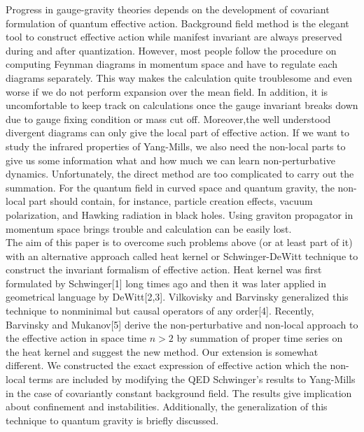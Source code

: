 \documentclass[a4paper,12 pt]{article}
\begin{document}
Progress in gauge-gravity theories depends on the development of
covariant formulation of quantum effective action. Background
field method is the elegant tool to construct effective action
while manifest invariant are always preserved during and after
quantization. However, most people follow the procedure on
computing Feynman diagrams in momentum space and have to regulate
each diagrams separately. This way makes the calculation quite
troublesome and even worse if we do not perform expansion over the
mean field. In addition, it is uncomfortable to keep track on
calculations once the gauge invariant breaks down due to gauge
fixing condition or mass cut off. Moreover,the well understood
divergent diagrams can only give the local part of effective
action. If we want to study the infrared properties of Yang-Mills,
we also need the non-local parts to give us some information what
and how much we can learn non-perturbative dynamics.
Unfortunately, the direct method are too complicated to carry out
the summation. For the quantum field in curved space and quantum
gravity, the non-local part should contain, for instance, particle
creation effects, vacuum polarization, and Hawking radiation in
black holes. Using graviton propagator in momentum space brings
trouble and calculation can be easily lost.\\
The aim of this paper is to overcome such problems above (or at
least part of it) with an alternative approach called heat kernel
or Schwinger-DeWitt technique to construct the invariant formalism
of effective action. Heat kernel was first formulated by
Schwinger[1] long times ago and then it was later applied in
geometrical language by DeWitt[2,3]. Vilkovisky and Barvinsky
generalized this technique to nonminimal but causal operators of
any order[4]. Recently, Barvinsky and Mukanov[5] derive the
non-perturbative and non-local approach to the effective action in
space time $ n
> 2 $ by summation of proper time series on the heat kernel and
suggest the new method. Our extension is somewhat different. We
constructed the exact expression of effective action which the
non-local terms are included by modifying the QED Schwinger's
results to Yang-Mills in the case of covariantly constant
background field. The results give implication about confinement
and instabilities. Additionally, the generalization of this
technique to quantum gravity is briefly discussed.
\end{document}
